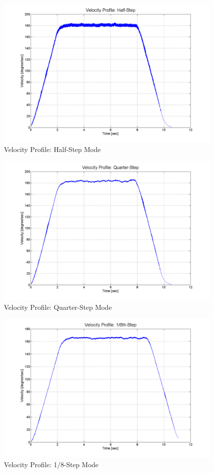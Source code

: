 \documentclass{article}
\theoremstyle{plain}
\theoremstyle{definition}
\theoremstyle{remark}
\begin{document}
\begin{figure}[h!]
\includegraphics[width=1\textwidth]{Q4_half_step.png}
\caption{Velocity Profile: Half-Step Mode} \label{tex}
\label{fig:q4_12}
\end{figure}

\begin{figure}[h!]
\includegraphics[width=1\textwidth]{Q4_quarter_step.png}
\caption{Velocity Profile: Quarter-Step Mode} \label{tex}
\label{fig:q4_13}
\end{figure}

\begin{figure}[h!]
\includegraphics[width=1\textwidth]{Q4_eighth_step.png}
\caption{Velocity Profile: 1/8-Step Mode} \label{tex}
\label{fig:q4_14}
\end{figure}
\clearpage
\end{document}
